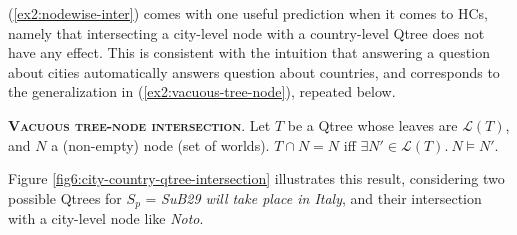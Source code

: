 (\ref{ex2:nodewise-inter}) comes with one useful prediction when it comes to HCs, namely that intersecting a city-level node with a country-level Qtree does not have any effect. This is consistent with the intuition that answering a question about cities automatically answers question about countries, and corresponds to the generalization in (\ref{ex2:vacuous-tree-node}), repeated below.

\begin{exe}
	 {\textsc{\textbf{Vacuous tree-node intersection}}. Let $T$ be a Qtree whose leaves are $\mathcal{L}(T)$, and $N$ a (non-empty) node (set of worlds). $T\cap N = N$ iff $\exists N' \in \mathcal{L}(T). \ N \vDash N'$.}
\end{exe}

Figure \ref{fig6:city-country-qtree-intersection} illustrates this result, considering two possible Qtrees for $S_p$ = \textit{SuB29 will take place in Italy}, and their intersection with a city-level node like \textit{Noto}.


